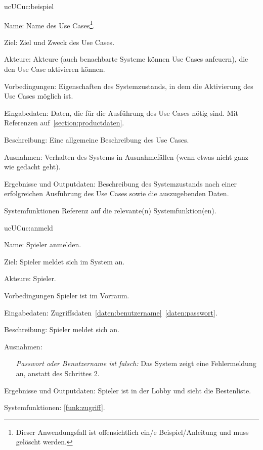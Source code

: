 \begin{description}[leftmargin=5em, style=sameline]

	\begin{lhp}{uc}{UC}{uc:beispiel}
		\item [Name:] Name des Use Cases\footnote{Dieser Anwendungsfall ist offensichtlich ein/e Beispiel/Anleitung und muss gelöscht werden.}.
		\item [Ziel:] Ziel und Zweck des Use Cases.
		\item [Akteure:] Akteure (auch benachbarte Systeme können Use Cases anfeuern), die den Use Case aktivieren können.
		\item [Vorbedingungen:] Eigenschaften des Systemzustands, in dem die Aktivierung des Use Cases möglich ist.
		\item [Eingabedaten:] Daten, die für die Ausführung des Use Cases nötig sind. Mit Referenzen auf~\ref{section:productdaten}.
		\item [Beschreibung:] Eine allgemeine Beschreibung des Use Cases.
		\item [Ausnahmen:] Verhalten des Systems in Ausnahmefällen (wenn etwas nicht ganz wie gedacht geht).
		\item [Ergebnisse und Outputdaten:] Beschreibung des Systemzustands nach einer erfolgreichen Ausführung des Use Cases sowie die auszugebenden Daten.
		\item [Systemfunktionen] Referenz auf die relevante(n) Systemfunktion(en).
	\end{lhp}
	
	\begin{lhp}{uc}{UC}{uc:anmeld}
		\item [Name:] Spieler anmelden.
		\item [Ziel:] Spieler meldet sich im System an.
		\item [Akteure:] Spieler.
		\item [Vorbedingungen] Spieler ist im Vorraum.
		\item [Eingabedaten:] Zugriffsdaten~\ref{daten:benutzername}~\ref{daten:passwort}.
		\item [Beschreibung:] Spieler meldet sich an.							
		\item [Ausnahmen:] \hfill
			\begin{itemize} 
				\item[] \textit{Passwort oder Benutzername ist falsch:} Das System zeigt eine Fehlermeldung an, anstatt des Schrittes 2.
				
			\end{itemize}
		\item [Ergebnisse und Outputdaten:] Spieler ist in der Lobby und sieht die Bestenliste.	
		\item [Systemfunktionen:] \ref{funk:zugriff}.
	\end{lhp}
	

\end{description}
